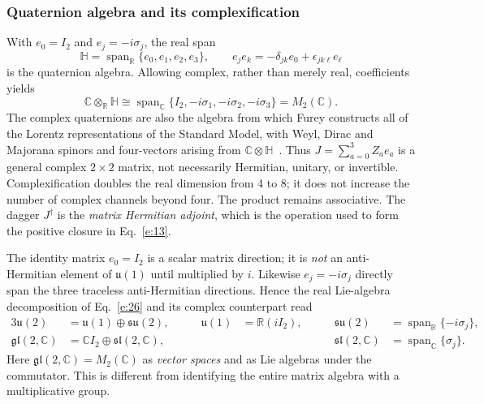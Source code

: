 \documentclass[10pt]{article}
\DeclareMathOperator{\spanop}{span}
\begin{document}
\subsubsection{Quaternion algebra and its complexification}

With $e_0=I_2$ and $e_j=-i\sigma_j$, the real span
\begin{equation}
\mathbb H=\spanop_{\mathbb R}\{e_0,e_1,e_2,e_3\},\qquad e_je_k=-\delta_{jk}e_0+\epsilon_{jk\ell}e_\ell\label{e:31}
\end{equation}
is the quaternion algebra. Allowing complex, rather than merely real, coefficients yields
\begin{equation}
\boxed{\mathbb C\otimes_{\mathbb R}\mathbb H\cong\spanop_{\mathbb C}\{I_2,-i\sigma_1,-i\sigma_2,-i\sigma_3\}=M_2(\mathbb C).}\label{e:32}
\end{equation}
The complex quaternions are also the algebra from which Furey constructs all of the Lorentz representations of the Standard Model, with Weyl, Dirac and Majorana spinors and four-vectors arising from $\mathbb C\otimes\mathbb H$~\cite{furey}. Thus $J=\sum_{a=0}^3Z_ae_a$ is a general complex $2\times2$ matrix, not necessarily Hermitian, unitary, or invertible. Complexification doubles the real dimension from 4 to 8; it does not increase the number of complex channels beyond four. The product remains associative. The dagger $J^\dagger$ is the \emph{matrix Hermitian adjoint}, which is the operation used to form the positive closure in Eq.~\eqref{e:13}.

The identity matrix $e_0=I_2$ is a scalar matrix direction; it is \emph{not} an anti-Hermitian element of $\mathfrak u(1)$ until multiplied by $i$. Likewise $e_j=-i\sigma_j$ directly span the three traceless anti-Hermitian directions. Hence the real Lie-algebra decomposition of Eq.~\eqref{e:26} and its complex counterpart read
\begin{alignat}{3}
\mathfrak u(2)&=\mathfrak u(1)\oplus\mathfrak{su}(2),&\qquad \mathfrak u(1)&=\mathbb R(iI_2),&\qquad \mathfrak{su}(2)&=\spanop_{\mathbb R}\{-i\sigma_j\},\label{e:33}\\
\mathfrak{gl}(2,\mathbb C)&=\mathbb CI_2\oplus\mathfrak{sl}(2,\mathbb C),&&&\qquad \mathfrak{sl}(2,\mathbb C)&=\spanop_{\mathbb C}\{\sigma_j\}.\label{e:34}\end{alignat}
Here $\mathfrak{gl}(2,\mathbb C)=M_2(\mathbb C)$ as \emph{vector spaces} and as Lie algebras under the commutator. This is different from identifying the entire matrix algebra with a multiplicative group.
\end{document}
